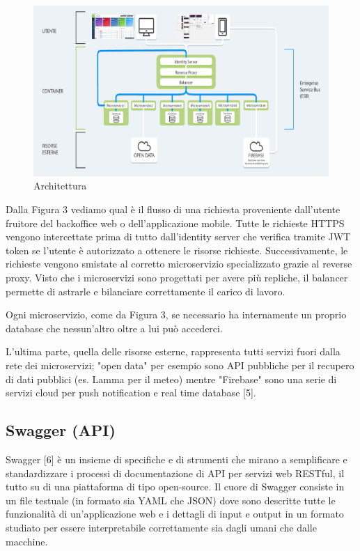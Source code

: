 \begin{figure}[h!]
    \centering  
    \caption{Architettura}
    \includegraphics[scale=0.6]{img/cap1/architecture}
\end{figure}

Dalla Figura 3 vediamo qual è il flusso di una richiesta proveniente dall'utente fruitore del backoffice web o
dell'applicazione mobile.
Tutte le richieste HTTPS vengono intercettate prima di tutto dall'identity server che verifica tramite JWT token
se l'utente è autorizzato a ottenere le risorse richieste.
Successivamente, le richieste vengono smistate al corretto microservizio specializzato grazie al reverse proxy.
Visto che i microservizi sono progettati per avere più repliche, il balancer permette di astrarle e bilanciare correttamente
il carico di lavoro.

Ogni microservizio, come da Figura 3, se necessario ha internamente un proprio database
che nessun'altro oltre a lui può accederci.

L'ultima parte, quella delle risorse esterne, rappresenta tutti servizi fuori dalla rete
dei microservizi; "open data" per esempio sono API pubbliche per il recupero di dati pubblici (es. Lamma per il meteo)
mentre "Firebase" sono una serie di servizi cloud per push notification e real time database [5].

\subsection{Swagger (API)}
Swagger [6] è un insieme di specifiche e di strumenti che mirano a semplificare e
standardizzare i processi di documentazione di API per servizi web RESTful, il tutto su
di una piattaforma di tipo open-source.
Il cuore di Swagger consiste in un file testuale (in formato sia YAML che JSON) dove
sono descritte tutte le funzionalità di un’applicazione web e i dettagli di input e output
in un formato studiato per essere interpretabile correttamente sia dagli umani che
dalle macchine.
